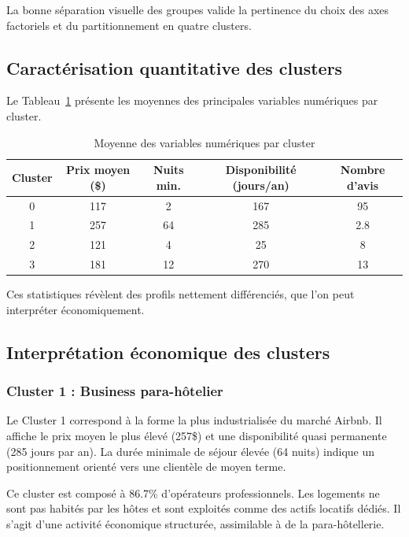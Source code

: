 \documentclass[a4paper, 12pt]{article}
\begin{document}
La bonne séparation visuelle des groupes valide la pertinence du choix des axes factoriels et du partitionnement en quatre clusters.

\subsection{Caractérisation quantitative des clusters}

Le Tableau~\ref{tab:clusters_num} présente les moyennes des principales variables numériques par cluster.

\begin{table}[H]
\centering
\caption{Moyenne des variables numériques par cluster}
\label{tab:clusters_num}
\begin{tabular}{c|c|c|c|c}
\hline
Cluster & Prix moyen (\$) & Nuits min. & Disponibilité (jours/an) & Nombre d’avis \\
\hline
0 & 117 & 2 & 167 & 95 \\
1 & 257 & 64 & 285 & 2.8 \\
2 & 121 & 4 & 25 & 8 \\
3 & 181 & 12 & 270 & 13 \\
\hline
\end{tabular}
\end{table}

Ces statistiques révèlent des profils nettement différenciés, que l’on peut interpréter économiquement.

\subsection{Interprétation économique des clusters}

\subsubsection*{Cluster 1 : Business para-hôtelier}

Le Cluster 1 correspond à la forme la plus industrialisée du marché Airbnb.  
Il affiche le prix moyen le plus élevé (257\$) et une disponibilité quasi permanente (285 jours par an).  
La durée minimale de séjour élevée (64 nuits) indique un positionnement orienté vers une clientèle de moyen terme.  

Ce cluster est composé à 86.7\% d’opérateurs professionnels. Les logements ne sont pas habités par les hôtes et sont exploités comme des actifs locatifs dédiés. Il s’agit d’une activité économique structurée, assimilable à de la para-hôtellerie.
\end{document}
